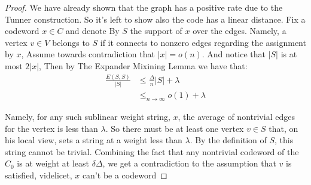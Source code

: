   \begin{proof} We have already shown that the graph has a positive rate due to the Tunner construction. So it's left to show also the code has a linear distance. Fix a codeword $x \in C$ and denote By $S$ the support of $x$ over the edges. Namely, a vertex $v\in V$ belongs to $S$ if it connects to nonzero edges regarding the assignment by $x$, Assume towards contradiction that $|x| = o\left( n \right)$. And notice that $|S|$ is at most $2|x|$, Then by The Expander Mixining Lemma we have that: 
  \begin{equation*}
    \begin{split}
      \frac{E\left( S,S \right)}{|S|} & \le \frac{\Delta}{n}|S|  + \lambda \\
      & \le_{ n \rightarrow \infty} o\left( 1 \right) + \lambda
    \end{split}
  \end{equation*}

  Namely, for any such sublinear weight string, $x$, the average of nontrivial edges for the vertex is less than $\lambda$. So there must be at least one vertex $v \in S$ that, on his local view, sets a  string at a weight less than $\lambda$. By the definition of $S$, this string cannot be trivial. Combining the fact that any nontrivial codeword of the $C_{0}$ is at weight at least $\delta\Delta$, we get a contradiction to the assumption that $v$ is satisfied, videlicet, $x$ can't be a codeword \end{proof}
 
